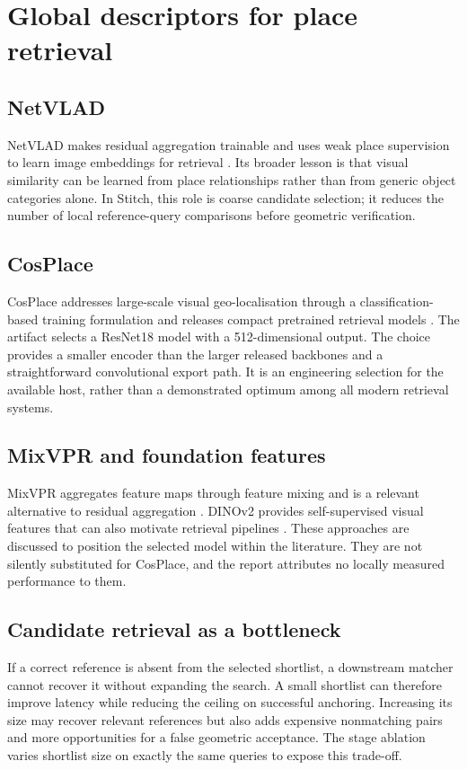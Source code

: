 \section{Global descriptors for place retrieval}
\subsection{NetVLAD}
NetVLAD makes residual aggregation trainable and uses weak place supervision to learn image embeddings for retrieval \citep{arandjelovic2016}. Its broader lesson is that visual similarity can be learned from place relationships rather than from generic object categories alone. In Stitch, this role is coarse candidate selection; it reduces the number of local reference-query comparisons before geometric verification.

\subsection{CosPlace}
CosPlace addresses large-scale visual geo-localisation through a classification-based training formulation and releases compact pretrained retrieval models \citep{berton2022,cosplacerepo}. The artifact selects a ResNet18 model with a 512-dimensional output. The choice provides a smaller encoder than the larger released backbones and a straightforward convolutional export path. It is an engineering selection for the available host, rather than a demonstrated optimum among all modern retrieval systems.

\ifFullReport
\subsection{MixVPR and foundation features}
MixVPR aggregates feature maps through feature mixing and is a relevant alternative to residual aggregation \citep{alibey2023}. DINOv2 provides self-supervised visual features that can also motivate retrieval pipelines \citep{oquab2023}. These approaches are discussed to position the selected model within the literature. They are not silently substituted for CosPlace, and the report attributes no locally measured performance to them.
\fi

\subsection{Candidate retrieval as a bottleneck}
If a correct reference is absent from the selected shortlist, a downstream matcher cannot recover it without expanding the search. A small shortlist can therefore improve latency while reducing the ceiling on successful anchoring. Increasing its size may recover relevant references but also adds expensive nonmatching pairs and more opportunities for a false geometric acceptance. The stage ablation varies shortlist size on exactly the same queries to expose this trade-off.

